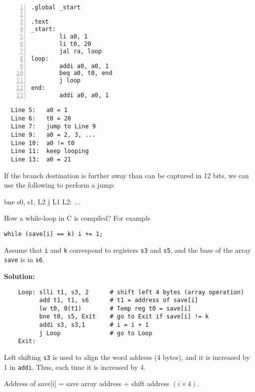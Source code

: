 \begin{eg}~

\begin{minipage}{0.5\textwidth}
\begin{Verbatim}[numbers=left,xleftmargin=5mm]
.global _start

.text
_start:
        li a0, 1
        li t0, 20
        jal ra, loop 
loop:
        addi a0, a0, 1
        beq a0, t0, end 
        j loop
end:    
        addi a0, a0, 1
\end{Verbatim}
\end{minipage}
\begin{minipage}{0.5\textwidth}
\color{red}
\begin{verbatim}
  Line 5:   a0 = 1
  Line 6:   t0 = 20
  Line 7:   jump to Line 9
  Line 9:   a0 = 2, 3, ...
  Line 10:  a0 != t0
  Line 11:  keep looping
  Line 13:  a0 = 21
\end{verbatim}
\end{minipage}
\end{eg}

If the branch destination is further away than can be captured in 12 bits, we can use the following to perform a jump:
\begin{codeBlock}
  bne s0, s1, L2
  j L1
L2: ...
\end{codeBlock}

\begin{eg}
  How a while-loop in C is compiled? For example 
  \begin{center}
    \verb|while (save[i] == k) i += 1;|
  \end{center}
  Assume that \verb|i| and \verb|k| correspond to registers \verb|s3| and \verb|s5|, and the base of the array \verb|save| is in \verb|s6|.

  \textbf{Solution:} 
  \color{red}
  \begin{verbatim}
    Loop: slli t1, s3, 2      # shift left 4 bytes (array operation)
          add t1, t1, s6      # t1 = address of save[i]
          lw t0, 0(t1)        # Temp reg t0 = save[i]
          bne t0, s5, Exit    # go to Exit if save[i] != k
          addi s3, s3,1       # i = i + 1
          j Loop              # go to Loop
    Exit:
  \end{verbatim}

  \begin{remark}
    Left shifting \verb|s3| is used to align the word address (4 bytes), and it is increased by 1 in \verb|addi|. Thus, each time it is increased by 4.

    Address of save[i] = save array address + shift address \((i \times 4)\).
  \end{remark}
\end{eg}

